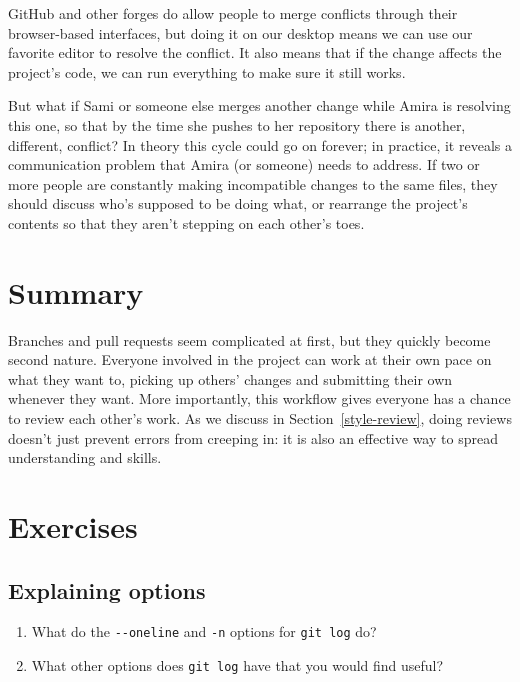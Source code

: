 \documentclass[
]{krantz}
\providecommand{\tightlist}{%
  \setlength{\itemsep}{0pt}\setlength{\parskip}{0pt}}
\begin{document}
GitHub and other forges do allow people to merge conflicts
through their browser-based interfaces,
but doing it on our desktop means we can use our favorite editor to resolve the conflict.
It also means that if the change affects the project's code,
we can run everything to make sure it still works.

But what if Sami or someone else merges another change
while Amira is resolving this one,
so that by the time she pushes to her repository
there is another, different, conflict?
In theory this cycle could go on forever;
in practice,
it reveals a communication problem that Amira (or someone) needs to address.
If two or more people are constantly making incompatible changes to the same files,
they should discuss who's supposed to be doing what,
or rearrange the project's contents so that they aren't stepping on each other's toes.

\hypertarget{git-advanced-summary}{%
\section{Summary}\label{git-advanced-summary}}

Branches and pull requests seem complicated at first,
but they quickly become second nature.
Everyone involved in the project can work at their own pace on what they want to,
picking up others' changes and submitting their own whenever they want.
More importantly,
this workflow gives everyone has a chance to review each other's work.
As we discuss in Section~\ref{style-review},
doing reviews doesn't just prevent errors from creeping in:
it is also an effective way to spread understanding and skills.

\hypertarget{git-advanced-exercises}{%
\section{Exercises}\label{git-advanced-exercises}}

\hypertarget{git-advanced-ex-explain-options}{%
\subsection{Explaining options}\label{git-advanced-ex-explain-options}}

\begin{enumerate}
\def\labelenumi{\arabic{enumi}.}
\tightlist
\item
  What do the \texttt{-\/-oneline} and \texttt{-n} options for \texttt{git\ log} do?
\item
  What other options does \texttt{git\ log} have that you would find useful?
\end{enumerate}
\end{document}
